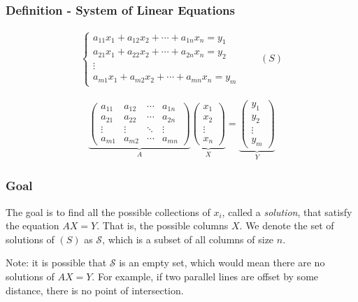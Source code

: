 \documentclass[usenames,dvipsnames,aspectratio=169,10pt]{beamer}
\numberwithin{equation}{section}
\begin{document}
\begin{frame}
\frametitle{Definition - System of Linear Equations}

\begin{align*}
\begin{cases}
a_{11} x_1  + a_{12} x_2 + \cdots + a_{1n} x_n = y_1 \\
a_{21} x_1  + a_{22} x_2 + \cdots + a_{2n} x_n = y_2 \\
\vdots \\
a_{m1} x_1  + a_{m2} x_2 + \cdots + a_{mn} x_n = y_m
\end{cases}
\qquad (S)
\end{align*}

\begin{align*}
\underbrace{
\begin{pmatrix}
a_{11} & a_{12} & \cdots & a_{1n} \\
a_{21} & a_{22} & \cdots & a_{2n} \\
\vdots & \vdots & \ddots & \vdots \\
a_{m1} & a_{m2} & \cdots & a_{mn}
\end{pmatrix}}_A
\underbrace{
\begin{pmatrix}
x_{1} \\
x_{2} \\
\vdots \\
x_{n}
\end{pmatrix}}_X
=
\underbrace{
\begin{pmatrix}
y_{1} \\
y_{2} \\
\vdots \\
y_{m}
\end{pmatrix}}_Y
\end{align*}
\end{frame}




\begin{frame}
\frametitle{Goal}

The goal is to find all the possible collections of $x_i$, called a \textit{solution}, that satisfy the equation $AX=Y$. That is, the possible columns $X$. We denote the set of solutions of $(S)$ as $\mathcal{S}$, which is a subset of all columns of size $n$.

Note: it is possible that $\mathcal{S}$ is an empty set, which would mean there are no solutions of $AX=Y$. For example, if two parallel lines are offset by some distance, there is no point of intersection.
\end{frame}
\end{document}
